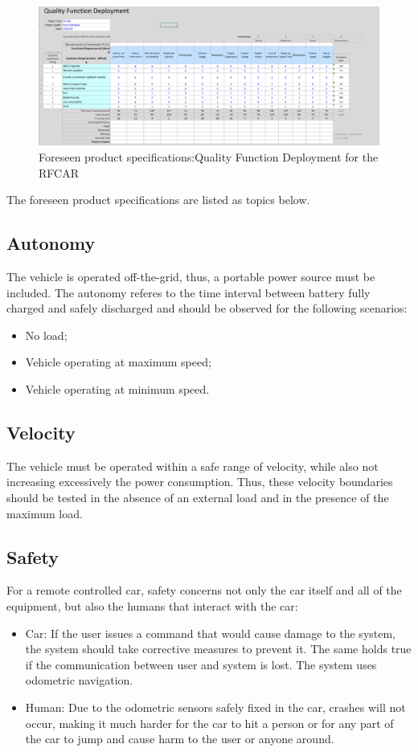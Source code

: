 \begin{figure}
\centering
\includegraphics[width=1.25\textwidth]{./sec/img/QFD_Initial.png}
\caption{\label{fig:QFD}Foreseen product specifications:Quality Function Deployment for the RFCAR}
\end{figure}
\newpage
The foreseen product specifications are listed as topics below.

\subsection{Autonomy}
\label{sec:org7364ba5}
The vehicle is operated off-the-grid, thus, a portable power source must be included. The autonomy referes to the time interval between battery fully charged and safely discharged and should be observed for the following scenarios:
\begin{itemize}
\item No load;
\item Vehicle operating at maximum speed;
\item Vehicle operating at minimum speed.
\end{itemize}
\subsection{Velocity}
\label{sec:org08718bc}
The vehicle must be operated within a safe range of velocity, while also not increasing excessively the power consumption. Thus, these velocity boundaries should be tested in the absence of an external load and in the presence of the maximum load.
\subsection{Safety}
\label{sec:org83942c3}
For a remote controlled car, safety concerns not only the car itself and all of the equipment, but also the humans that interact with the car:
\begin{itemize}
\item Car: If the user issues a command that would cause damage to the system, the
system should take corrective measures to prevent it. The same holds true if
the communication between user and system is lost. The system uses odometric navigation.
\item Human: Due to the odometric sensors safely fixed in the car, crashes will not occur, making it much harder for the car to hit a person or for any part of the car to jump and cause harm to the user or anyone around.
\end{itemize}
